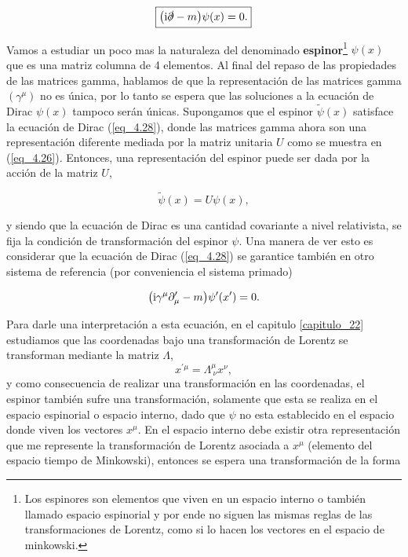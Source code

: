  \begin{equation}
 	\boxed{ \qty\big( \mathrm{i} \slashed{\partial} -m )\psi(x) =0. }
 	\label{eq_4.30}
 \end{equation}

Vamos a estudiar un poco mas la naturaleza del denominado \textbf{espinor}\footnote{Los espinores son elementos que viven en un espacio interno o también llamado espacio espinorial y por ende no siguen las mismas reglas de las transformaciones de Lorentz, como si lo hacen los vectores en el espacio de minkowski.} $\psi(x)$ que es una matriz columna de 4 elementos. Al final del repaso de las propiedades de las matrices gamma, hablamos de que la representación de las matrices gamma $ (\gamma^\mu) $ no es única, por lo tanto se espera que las soluciones a la ecuación de Dirac $\psi (x)$ tampoco serán únicas. Supongamos que el espinor $\tilde{\psi}(x)$ satisface la ecuación de Dirac (\ref{eq_4.28}), donde las matrices gamma ahora son una representación diferente mediada por la matriz unitaria $U$ como se muestra en  (\ref{eq_4.26}). Entonces, una representación del espinor puede ser dada por la acción de la matriz $U$,

\begin{equation}
	\tilde{\psi}(x) = U \psi(x),
\end{equation}

y siendo que la ecuación de Dirac es una cantidad covariante a nivel relativista, se fija la condición de transformación del espinor $\psi$. Una manera de ver esto es considerar que la ecuación de Dirac (\ref{eq_4.28}) se garantice también en otro sistema de referencia (por conveniencia el sistema primado) 

\begin{equation}
	\qty( \mathrm{i} \gamma^\mu \partial_\mu ^\prime - m ) \psi^\prime (x^\prime) = 0.
	\label{eq_4.32}
\end{equation} 

Para darle una interpretación a esta ecuación, en el capitulo \ref{capitulo_22} estudiamos que las coordenadas bajo una transformación de Lorentz se transforman mediante la matriz $\Lambda$, 
\begin{equation}
	x^{\prime \mu} = \Lambda^\mu_{~\nu} x^\nu,
\end{equation}
y como consecuencia de realizar una transformación en las coordenadas, el espinor también sufre una transformación, solamente que esta se realiza en el espacio espinorial o espacio interno, dado que $\psi$ no esta establecido en el espacio donde viven los vectores $x^\mu$. En el espacio interno debe existir otra representación que me represente la transformación de Lorentz asociada a $x^\mu$ (elemento del espacio tiempo de Minkowski), entonces se espera una transformación de la forma

